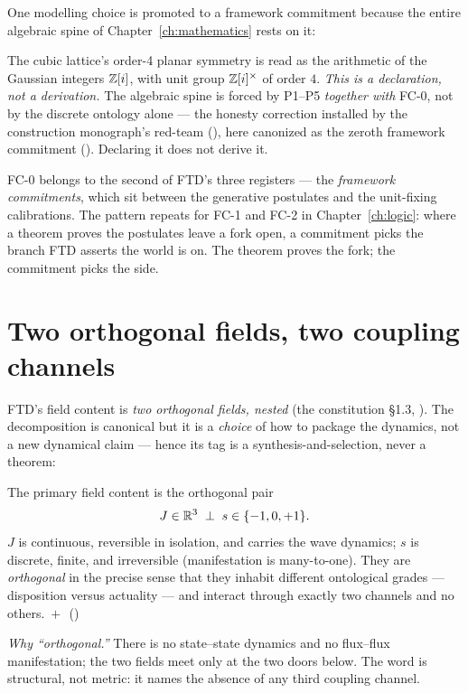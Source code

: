 One modelling choice is promoted to a framework commitment because the entire
algebraic spine of Chapter~\ref{ch:mathematics} rests on it:

\begin{forcedbox}
The cubic lattice's order-4 planar symmetry is read as the arithmetic of the
Gaussian integers $\mathbb{Z}[i]$, with unit group $\mathbb{Z}[i]^{\times}$ of order $4$. \emph{This is a
declaration, not a derivation.} The algebraic spine is forced by P1--P5
\emph{together with} FC-0, not by the discrete ontology alone --- the honesty
correction installed by the construction monograph's red-team (),
here canonized as the zeroth framework commitment (). Declaring it
does not derive it. \hfill{}
\end{forcedbox}

FC-0 belongs to the second of FTD's three registers --- the
\emph{framework commitments}, which sit between the generative postulates and the
unit-fixing calibrations. The pattern repeats for FC-1 and FC-2 in
Chapter~\ref{ch:logic}: where a theorem proves the postulates leave a fork open, a
commitment picks the branch FTD asserts the world is on. The theorem proves the
fork; the commitment picks the side.

\section{Two orthogonal fields, two coupling channels}\label{sec:channels}

FTD's field content is \emph{two orthogonal fields, nested} (the constitution
\S1.3, ). The decomposition is canonical but it is a \emph{choice} of
how to package the dynamics, not a new dynamical claim --- hence its tag is a
synthesis-and-selection, never a theorem:

\begin{claim}\label{cl:primarypair}
The primary field content is the orthogonal pair
\[
  J \in \mathbb{R}^3 \;\perp\; s \in \{-1,0,+1\} .
\]
$J$ is continuous, reversible in isolation, and carries the wave dynamics; $s$ is
discrete, finite, and irreversible (manifestation is many-to-one). They are
\emph{orthogonal} in the precise sense that they inhabit different ontological
grades --- disposition versus actuality --- and interact through exactly two
channels and no others. \,$+$\,~()
\end{claim}

\noindent\textit{Why ``orthogonal.''} There is no state--state dynamics and no
flux--flux manifestation; the two fields meet only at the two doors below. The
word is structural, not metric: it names the absence of any third coupling
channel.

